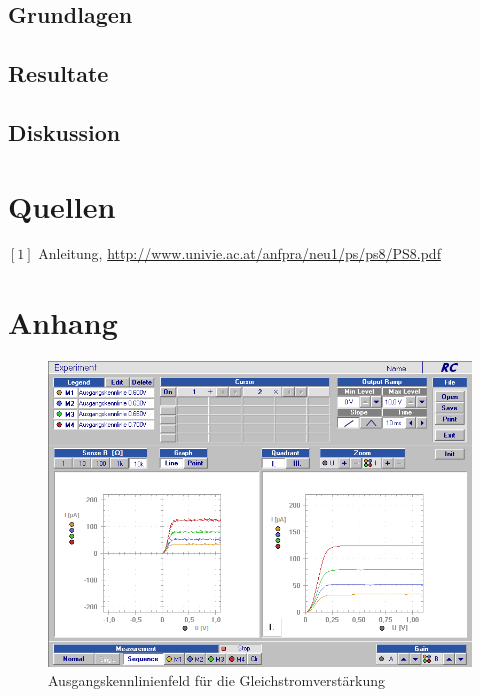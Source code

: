 \documentclass[12pt,a4paper]{article}
\begin{document}
\begin{multicols}{2}


\subsection{Grundlagen}



\subsection{Resultate}


\subsection{Diskussion}


\section{Quellen}
$[1]$ Anleitung, \url{http://www.univie.ac.at/anfpra/neu1/ps/ps8/PS8.pdf}\\

\end{multicols}
\section{Anhang}

\begin{figure}[H]
	\centering
	\includegraphics[scale=0.5]{./data/Braun_Kurz_PS8/Ausgangskennlinienfeld.png}
	\caption{Ausgangskennlinienfeld für die Gleichstromverstärkung}
	\label{fig:ausgangskennlinienfeld}
\end{figure}
\end{document}
